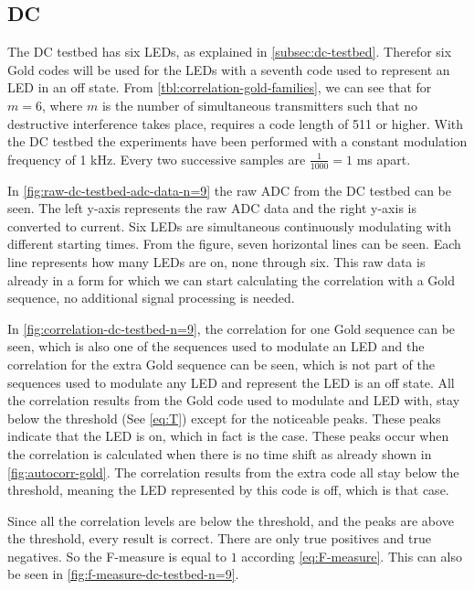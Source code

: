 
\subsection{DC}
\label{subsec:dc-testbed-eval}

The DC testbed has six LEDs, as explained in \autoref{subsec:dc-testbed}.
Therefor six Gold codes will be used for the LEDs with a seventh code used to represent an LED in an off state.
From \autoref{tbl:correlation-gold-families}, we can see that for $m = 6$, where $m$ is the number of simultaneous transmitters such that no destructive interference takes place, requires a code length of 511 or higher.
With the DC testbed the experiments have been performed with a constant modulation frequency of 1 kHz.
Every two successive samples are $\frac{1}{1000} = 1$ ms apart.

In \autoref{fig:raw-dc-testbed-adc-data-n=9} the raw ADC from the DC testbed can be seen.
The left y-axis represents the raw ADC data and the right y-axis is converted to current.
Six LEDs are simultaneous continuously modulating with different starting times.
From the figure, seven horizontal lines can be seen.
Each line represents how many LEDs are on, none through six.
This raw data is already in a form for which we can start calculating the correlation with a Gold sequence, no additional signal processing is needed.

In \autoref{fig:correlation-dc-testbed-n=9}, the correlation for one Gold sequence can be seen, which is also one of the sequences used to modulate an LED and the correlation for the extra Gold sequence can be seen, which is not part of the sequences used to modulate any LED and represent the LED is an off state.
All the correlation results from the Gold code used to modulate and LED with, stay below the threshold (See \autoref{eq:T}) except for the noticeable peaks.
These peaks indicate that the LED is on, which in fact is the case.
These peaks occur when the correlation is calculated when there is no time shift as already shown in \autoref{fig:autocorr-gold}.
The correlation results from the extra code all stay below the threshold, meaning the LED represented by this code is off, which is that case.

Since all the correlation levels are below the threshold, and the peaks are above the threshold, every result is correct.
There are only true positives and true negatives.
So the F-measure is equal to $1$ according \autoref{eq:F-measure}.
This can also be seen in \autoref{fig:f-measure-dc-testbed-n=9}.

